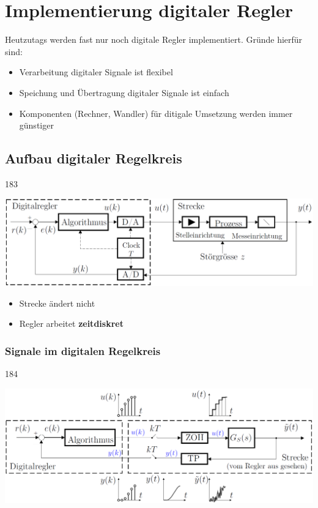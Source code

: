 \section{Implementierung digitaler Regler}

Heutzutags werden fast nur noch digitale Regler implementiert. Gründe hierfür sind:

\begin{itemize}
    \item Verarbeitung digitaler Signale ist flexibel
    \item Speichung und Übertragung digitaler Signale ist einfach
    \item Komponenten (Rechner, Wandler) für ditigale Umsetzung werden immer günstiger
\end{itemize}


\subsection{Aufbau digitaler Regelkreis}{183}

\begin{minipage}[c]{0.63\columnwidth}
    \includegraphics[width=\columnwidth]{images/regelkreis_mit_digitalregler.png}
\end{minipage}
\hfill
\begin{minipage}[c]{0.35\columnwidth}
    \begin{itemize}
        \item Strecke ändert nicht
        \item Regler arbeitet \textbf{zeitdiskret}
    \end{itemize}
\end{minipage}


\subsubsection{Signale im digitalen Regelkreis}{184}

\begin{center}
    \includegraphics[width=0.75\columnwidth]{images/digitaler_regelkreis_signaltypen.png}
\end{center}

